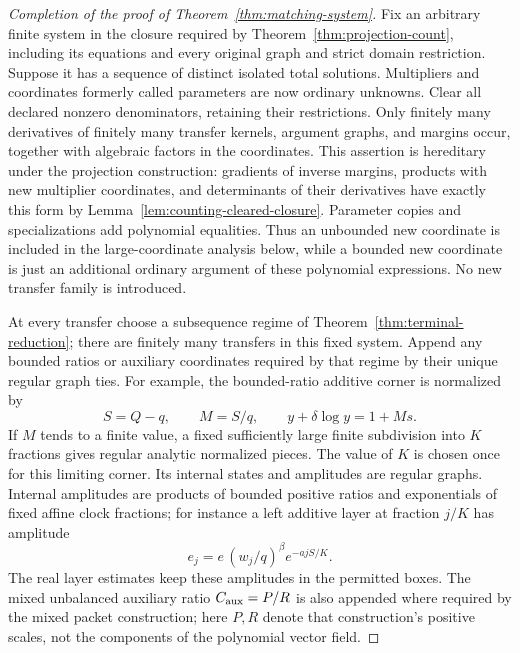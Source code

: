 \begin{proof}[Completion of the proof of Theorem~\ref{thm:matching-system}]
Fix an arbitrary finite system in the closure required by
Theorem~\ref{thm:projection-count}, including its equations and every
original graph and strict domain restriction.  Suppose it has a
sequence of distinct isolated total solutions.  Multipliers and
coordinates formerly called parameters are now ordinary unknowns.
Clear all declared nonzero denominators, retaining their restrictions.
Only finitely many derivatives of finitely many transfer kernels,
argument graphs, and margins occur, together with algebraic factors
in the coordinates.
This assertion is hereditary under the projection construction:
gradients of inverse margins, products with new multiplier coordinates,
and determinants of their derivatives have exactly this form by
Lemma~\ref{lem:counting-cleared-closure}.  Parameter copies and
specializations add polynomial equalities.  Thus an unbounded new
coordinate is included in the large-coordinate analysis below, while
a bounded new coordinate is just an additional ordinary argument of
these polynomial expressions.  No new transfer family is introduced.

At every transfer choose a subsequence regime of
Theorem~\ref{thm:terminal-reduction}; there are finitely many transfers
in this fixed system.  Append any bounded ratios or auxiliary
coordinates required by that regime by their unique regular graph
ties.  For example, the bounded-ratio additive corner is normalized
by
\begin{equation}\label{eq:counting-ratio}
 S=Q-q,\qquad M=S/q,\qquad
 y+\delta\log y=1+Ms.
\end{equation}
If $M$ tends to a finite value, a fixed sufficiently large finite
subdivision into $K$ fractions gives regular analytic normalized
pieces.  The value of $K$ is chosen once for this limiting corner.
Its internal states and amplitudes are regular graphs.  Internal
amplitudes are products of bounded positive ratios and exponentials
of fixed affine clock fractions; for instance a left additive layer
at fraction $j/K$ has amplitude
\[
 e_j=e\,(w_j/q)^\beta e^{-a jS/K}.
\]
The real layer estimates keep these amplitudes in the permitted
boxes.  The mixed unbalanced auxiliary ratio $C_{\rm aux}=P/R$ is
also appended where required by the mixed packet construction; here
$P,R$ denote that construction's positive scales, not the components
of the polynomial vector field.


\end{proof}
